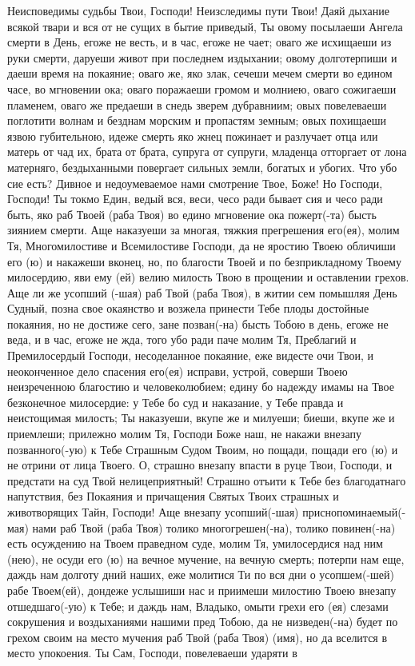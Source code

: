 \mychapterending{}

\begin{mymulticols}


Неисповедимы судьбы Твои, Господи! Неизследимы пути Твои! Даяй дыхание всякой твари и вся от не сущих в бытие приведый, Ты овому посылаеши Ангела смерти в День, егоже не весть, и в час, егоже не чает; оваго же исхищаеши из руки смерти, даруеши живот при последнем издыхании; овому долготерпиши и даеши время на покаяние; оваго же, яко злак, сечеши мечем смерти во едином часе, во мгновении ока; оваго поражаеши громом и молниею, оваго сожигаеши пламенем, оваго же предаеши в снедь зверем дубравниим; овых повелеваеши поглотити волнам и безднам морским и пропастям земным; овых похищаеши язвою губительною, идеже смерть яко жнец пожинает и разлучает отца или матерь от чад их, брата от брата, супруга от супруги, младенца отторгает от лона матерняго, бездыханными повергает сильных земли, богатых и убогих. Что убо сие есть? Дивное и недоумеваемое нами смотрение Твое, Боже! Но Господи, Господи! Ты токмо Един, ведый вся, веси, чесо ради бывает сия и чесо ради быть, яко раб Твоей (раба Твоя)  во едино мгновение ока пожерт(-та) бысть зиянием смерти. Аще наказуеши за многая, тяжкия прегрешения его(ея), молим Тя, Многомилостиве и Всемилостиве Господи, да не яростию Твоею обличиши его (ю) и накажеши вконец, но, по благости Твоей и по безприкладному Твоему милосердию, яви ему (ей) велию милость Твою в прощении и оставлении грехов. Аще ли же усопший (-шая) раб Твой (раба Твоя), в житии сем помышляя День Судный, позна свое окаянство и возжела принести Тебе плоды достойные покаяния, но не достиже сего, зане позван(-на) бысть Тобою в день, егоже не веда, и в час, егоже не жда, того убо ради паче молим Тя, Преблагий и Премилосердый Господи, несоделанное покаяние, еже видесте очи Твои, и неоконченное дело спасения его(ея) исправи, устрой, соверши Твоею неизреченною благостию и человеколюбием; едину бо надежду имамы на Твое безконечное милосердие: у Тебе бо суд и наказание, у Тебе правда и неистощимая милость; Ты наказуеши, вкупе же и милуеши; биеши, вкупе же и приемлеши; прилежно молим Тя, Господи Боже наш, не накажи внезапу позванного(-ую) к Тебе Страшным Судом Твоим, но пощади, пощади его (ю) и не отрини от лица Твоего. О, страшно внезапу впасти в руце Твои, Господи, и предстати на суд Твой нелицеприятный! Страшно отъити к Тебе без благодатнаго напутствия, без Покаяния и причащения Святых Твоих страшных и животворящих Тайн, Господи! Аще внезапу усопший(-шая) приснопоминаемый(-мая) нами раб Твой (раба Твоя) толико многогрешен(-на), толико повинен(-на) есть осуждению на Твоем праведном суде, молим Тя, умилосердися над ним (нею), не осуди его (ю) на вечное мучение, на вечную смерть; потерпи нам еще, даждь нам долготу дний наших, еже молитися Ти по вся дни о усопшем(-шей) рабе Твоем(ей), дондеже услышиши нас и приимеши милостию Твоею внезапу отшедшаго(-ую) к Тебе; и даждь нам, Владыко, омыти грехи его (ея) слезами сокрушения и воздыханиями нашими пред Тобою, да не низведен(-на) будет по грехом своим на место мучения раб Твой (раба Твоя) (имя), но да вселится в место упокоения. Ты Сам, Господи, повелеваеши ударяти в 
\end{mymulticols}
